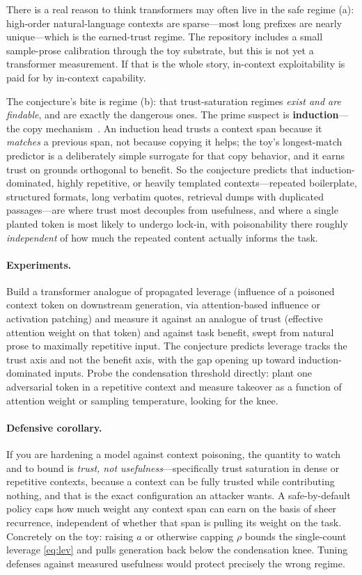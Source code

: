 \documentclass[11pt]{article}
\theoremstyle{plain}
\theoremstyle{definition}
\theoremstyle{remark}
\begin{document}
There is a real reason to think transformers may often live in the safe regime (a):
high-order natural-language contexts are sparse---most long prefixes are nearly unique---which
is the earned-trust regime. The repository includes a small sample-prose calibration through
the toy substrate, but this is not yet a transformer measurement. If that is the whole story,
in-context exploitability is paid for by in-context capability.

The conjecture's bite is regime (b): that trust-saturation regimes \emph{exist and are
findable}, and are exactly the dangerous ones. The prime suspect is \textbf{induction}---the
copy mechanism~\cite{olsson2022}. An induction head trusts a context span because it
\emph{matches} a previous span, not because copying it helps; the toy's longest-match
predictor is a deliberately simple surrogate for that copy behavior, and it earns trust
on grounds orthogonal to benefit. So the
conjecture predicts that induction-dominated, highly repetitive, or heavily templated
contexts---repeated boilerplate, structured formats, long verbatim quotes, retrieval dumps
with duplicated passages---are where trust most decouples from usefulness, and where a single
planted token is most likely to undergo lock-in, with poisonability there roughly
\emph{independent} of how much the repeated content actually informs the task.

\paragraph{Experiments.}
Build a transformer analogue of propagated leverage (influence of a poisoned context token on
downstream generation, via attention-based influence or activation patching) and measure it
against an analogue of trust (effective attention weight on that token) and against task
benefit, swept from natural prose to maximally repetitive input. The conjecture predicts
leverage tracks the trust axis and not the benefit axis, with the gap opening up toward
induction-dominated inputs. Probe the condensation threshold directly: plant one adversarial
token in a repetitive context and measure takeover as a function of attention weight or
sampling temperature, looking for the knee.

\paragraph{Defensive corollary.}
If you are hardening a model against context poisoning, the quantity to watch and to bound is
\emph{trust, not usefulness}---specifically trust saturation in dense or repetitive contexts,
because a context can be fully trusted while contributing nothing, and that is the exact
configuration an attacker wants. A safe-by-default policy caps how much weight any context
span can earn on the basis of sheer recurrence, independent of whether that span is pulling
its weight on the task. Concretely on the toy: raising $a$ or otherwise capping $\rho$ bounds
the single-count leverage \eqref{eq:lev} and pulls generation back below the condensation
knee. Tuning defenses against measured usefulness would protect precisely the wrong regime.
\end{document}
